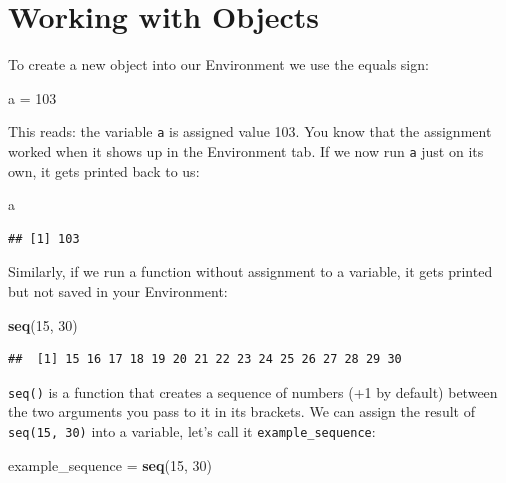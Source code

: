 \documentclass[12pt,]{krantz}
\makeatletter
\newenvironment{Shaded}{\begin{snugshade}}{\end{snugshade}}
\newcommand{\DecValTok}[1]{\textcolor[rgb]{0.00,0.00,0.81}{#1}}
\newcommand{\KeywordTok}[1]{\textcolor[rgb]{0.13,0.29,0.53}{\textbf{#1}}}
\newcommand{\NormalTok}[1]{#1}
\newcommand{\StringTok}[1]{\textcolor[rgb]{0.31,0.60,0.02}{#1}}
\newenvironment{kframe}{%
\medskip{}
\setlength{\fboxsep}{.8em}
 \def\at@end@of@kframe{}%
 \ifinner\ifhmode%
  \def\at@end@of@kframe{\end{minipage}}%
  \begin{minipage}{\columnwidth}%
 \fi\fi%
 \def\FrameCommand##1{\hskip\@totalleftmargin \hskip-\fboxsep
 \colorbox{shadecolor}{##1}\hskip-\fboxsep
     \hskip-\linewidth \hskip-\@totalleftmargin \hskip\columnwidth}%
 \MakeFramed {\advance\hsize-\width
   \@totalleftmargin\z@ \linewidth\hsize
   \@setminipage}}%
 {\par\unskip\endMakeFramed%
 \at@end@of@kframe}
\renewenvironment{Shaded}{\begin{kframe}}{\end{kframe}}
\theoremstyle{definition}
\theoremstyle{definition}
\theoremstyle{definition}
\theoremstyle{remark}
\makeatother
\begin{document}
\hypertarget{working-with-objects}{%
\section{Working with Objects}\label{working-with-objects}}

To create a new object into our Environment we use the equals sign:

\begin{Shaded}
\begin{Highlighting}[]
\NormalTok{a =}\StringTok{ }\DecValTok{103}
\end{Highlighting}
\end{Shaded}

This reads: the variable \texttt{a} is assigned value 103. You know that
the assignment worked when it shows up in the Environment tab. If we now
run \texttt{a} just on its own, it gets printed back to us:

\begin{Shaded}
\begin{Highlighting}[]
\NormalTok{a}
\end{Highlighting}
\end{Shaded}

\begin{verbatim}
## [1] 103
\end{verbatim}

Similarly, if we run a function without assignment to a variable, it
gets printed but not saved in your Environment:

\begin{Shaded}
\begin{Highlighting}[]
\KeywordTok{seq}\NormalTok{(}\DecValTok{15}\NormalTok{, }\DecValTok{30}\NormalTok{)}
\end{Highlighting}
\end{Shaded}

\begin{verbatim}
##  [1] 15 16 17 18 19 20 21 22 23 24 25 26 27 28 29 30
\end{verbatim}

\texttt{seq()} is a function that creates a sequence of numbers (+1 by
default) between the two arguments you pass to it in its brackets. We
can assign the result of \texttt{seq(15,\ 30)} into a variable, let's
call it \texttt{example\_sequence}:

\begin{Shaded}
\begin{Highlighting}[]
\NormalTok{example_sequence =}\StringTok{ }\KeywordTok{seq}\NormalTok{(}\DecValTok{15}\NormalTok{, }\DecValTok{30}\NormalTok{)}
\end{Highlighting}
\end{Shaded}
\end{document}
